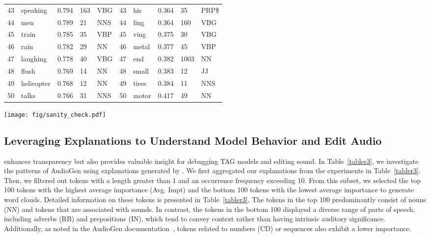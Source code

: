 \begin{table*}[!ht]
\begin{tabular}{lllll|lllll}
        43 & speaking & 0.794 & 163 & VBG & 43 & his & 0.364 & 35 & PRP\$ \\ 
        44 & men & 0.789 & 21 & NNS & 44 & ling & 0.364 & 160 & VBG \\ 
        45 & train & 0.785 & 35 & VBP & 45 & ving & 0.375 & 30 & VBG \\ 
        46 & rain & 0.782 & 29 & NN & 46 & metal & 0.377 & 45 & VBP \\ 
        47 & laughing & 0.778 & 40 & VBG & 47 & end & 0.382 & 1003 & NN \\ 
        48 & flush & 0.769 & 14 & NN & 48 & small & 0.383 & 12 & JJ \\ 
        49 & helicopter & 0.768 & 12 & NN & 49 & tires & 0.384 & 11 & NNS \\ 
        50 & talks & 0.766 & 31 & NNS & 50 & motor & 0.417 & 49 & NN \\         
        \bottomrule
    \end{tabular}
    \caption{Averaged importance (Impt) per textual token learned by \mname{}. The name of the POS (Part of Speech) is followed by the categories in NLTK. Count refers to the occurrence frequency in the test dataset of AudioCaps.}
    \label{tabler3}
\end{table*}

\begin{figure*}
    \center
    \texttt{[image: fig/sanity\_check.pdf]}
    \caption{Examplar explanations using independent randomization on Transformer-decoder of AudioGen as the sanity check.}
    \label{sanitycheck}
\end{figure*}

\subsection{Leveraging Explanations to Understand Model Behavior and Edit Audio}
\label{casestudy}

\mname{} enhances transparency but also provides valuable insight for debugging TAG models and editing sound. In Table~\ref{tabler3}, we investigate the patterns of AudioGen using explanations generated by \mname{}. We first aggregated our explanations from the experiments in Table~\ref{tabler3}. Then, we filtered out tokens with a length greater than 1 and an occurrence frequency exceeding 10. From this subset, we selected the top 100 tokens with the highest average importance (Avg. Impt) and the bottom 100 tokens with the lowest average importance to generate word clouds. Detailed information on these tokens is presented in Table~\ref{tabler3}. The tokens in the top 100 predominantly consist of nouns (NN) and tokens that are associated with sounds. In contrast, the tokens in the bottom 100 displayed a diverse range of parts of speech, including adverbs (RB) and prepositions (IN), which tend to convey context rather than having intrinsic auditory significance. Additionally, as noted in the AudioGen documentation~\cite{kreuk2022audiogen}, tokens related to numbers (CD) or sequences also exhibit a lower importance.

